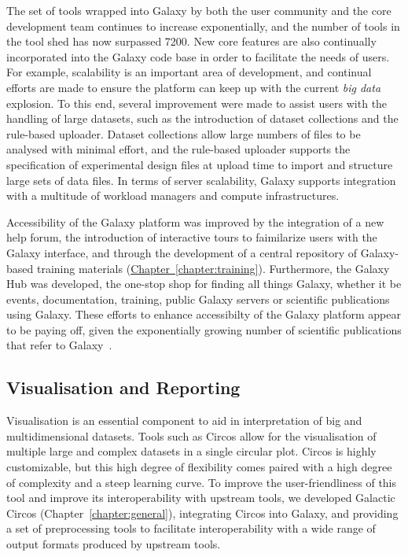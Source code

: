 The set of tools wrapped into Galaxy by both the user community and the core development team continues to increase exponentially, and the number of tools in the tool shed has now surpassed 7200. New core features are also continually incorporated into the Galaxy code base in order to facilitate the needs of users. For example, scalability is an important area of development, and continual efforts are made to ensure the platform can keep up with the current \emph{big data} explosion. To this end, several improvement were made to assist users with the handling of large datasets, such as the introduction of dataset collections and the rule-based uploader. Dataset collections allow large numbers of files to be analysed with minimal effort, and the rule-based uploader supports the specification of experimental design files at upload time to import and structure large sets of data files. In terms of server scalability, Galaxy supports integration with a multitude of workload managers and compute infrastructures.

Accessibility of the Galaxy platform was improved by the integration of a new help forum, the introduction of interactive tours to faimilarize users with the Galaxy interface, and through the development of a central repository of Galaxy-based training materials (\hyperref[chapter:galaxy]{Chapter~\ref{chapter:training}}). Furthermore, the Galaxy Hub was developed, the one-stop shop for finding all things Galaxy, whether it be events, documentation, training, public Galaxy servers or scientific publications using Galaxy. These efforts to enhance accessibilty of the Galaxy platform appear to be paying off, given the exponentially growing number of scientific publications that refer to Galaxy~\cite{url-zotero-galaxy}.



\subsection{Visualisation and Reporting}
Visualisation is an essential component to aid in interpretation of big and multidimensional datasets. Tools such as Circos \cite{circos} allow for the visualisation of multiple large and complex datasets in a single circular plot. Circos is highly customizable, but this high degree of flexibility comes paired with a high degree of complexity and a steep learning curve. To improve the user-friendliness of this tool and improve its interoperability with upstream tools, we developed Galactic Circos (Chapter~\ref{chapter:general}), integrating Circos into Galaxy, and providing a set of preprocessing tools to facilitate interoperability with a wide range of output formats produced by upstream tools.

